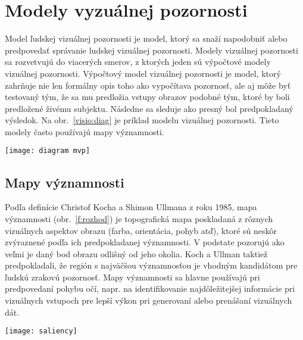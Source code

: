 \documentclass[10pt,twoside,slovak,a4paper]{article}
\begin{document}
\section{Modely vyzuálnej pozornosti} \label{1modely}
Model ľudskej vizuálnej pozornosti je model, ktorý sa snaží napodobniť alebo predpovedať správanie ludskej vizuálnej pozornosti. Modely vizuálnej pozornosti sa rozvetvujú do viacerých smerov, z ktorých jeden sú výpočtové modely vizuálnej pozornosti. Výpočtový model vizuálnej pozornosti je model, ktorý zahrňuje nie len formálny opis toho ako vypočítava pozornosť, ale aj môže byť testovaný tým, že sa mu predložia vstupy obrazov podobné tým, ktoré by boli predložené živému subjektu. Následne sa sleduje ako presný bol predpokladaný výsledok. Na obr.~\ref{visio:diag} je príklad modelu vizuálnej pozornosti. Tieto modely často používajú mapy významnosti.
\begin{figure*}[tbh]
\centering
\texttt{[image: diagram mvp]}
\caption{príklad modelu vizuálnej pozornosti, ktorý napodobňuje reakciu ľudského zraku na vizuálny podnet.}
\label{visio:diag}
\end{figure*}

\subsection{Mapy významnosti} \label{ina:nejake}
Podľa definície Christof Kocha a Shimon Ullmana z roku 1985, mapa významnosti (obr.~\ref{f:rozhod}) je topografická mapa poskladaná z rôznych vizuálnych aspektov obrazu (farba, orientácia, pohyb atď), ktoré sú neskôr zvýraznené podľa ich predpokladanej významnosti. V podstate pozorujú ako veľmi je daný bod obrazu odlišný od jeho okolia. Koch a Ullman taktiež predpokladali, že región s najväčšou významnosťou je vhodným kandidátom pre ľudskú zrakovú pozornosť. Mapy významnosti sa hlavne používajú pri predpovedaní pohybu očí, napr. na identifikovanie najdôležitejšej informácie pri vizuálnych vstupoch pre lepší výkon pri generovaní alebo prenášaní vizuálnych dát.
\begin{figure*}[tbh]
\centering
\texttt{[image: saliency]}
\caption{Príklad mapy významnosti. Napravo je je vizuálny obraz a naľavo je jeho mapa významnosti.}
\label{f:rozhod}
\end{figure*}
\end{document}
